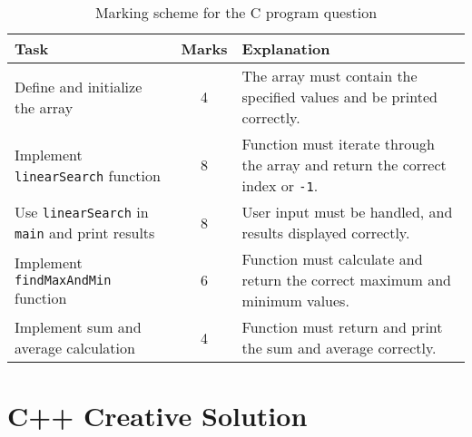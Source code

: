 \documentclass[a4paper,12pt]{article}
\begin{document}
\begin{table}[h!]
\centering
\begin{tabular}{|l|c|p{8cm}|}
\hline
\textbf{Task} & \textbf{Marks} & \textbf{Explanation} \\ \hline
Define and initialize the array & 4 & The array must contain the specified values and be printed correctly. \\ \hline
Implement \texttt{linearSearch} function & 8 & Function must iterate through the array and return the correct index or \texttt{-1}. \\ \hline
Use \texttt{linearSearch} in \texttt{main} and print results & 8 & User input must be handled, and results displayed correctly. \\ \hline
Implement \texttt{findMaxAndMin} function & 6 & Function must calculate and return the correct maximum and minimum values. \\ \hline
Implement sum and average calculation & 4 & Function must return and print the sum and average correctly. \\ \hline
\end{tabular}
\caption{Marking scheme for the C program question}
\label{tab:marking_scheme_c}
\end{table}


\newpage

\section{C++ Creative Solution}
\end{document}
